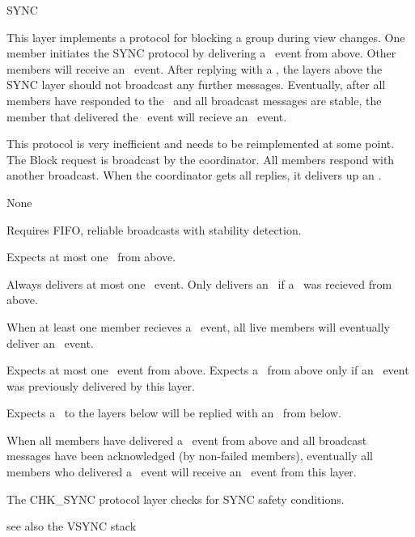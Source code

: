 \begin{Layer}{SYNC}

This layer implements a protocol for blocking a group during view changes.  One
member initiates the SYNC protocol by delivering a \DnBlock\ event from above.
Other members will receive an \UpBlock\ event.  After replying with a
\DnBlockOk, the layers above the SYNC layer should not broadcast any further
messages.  Eventually, after all members have responded to the \UpBlock\ and
all broadcast messages are stable, the member that delivered the \DnBlock\
event will recieve an \UpBlockOk\ event.

\begin{Protocol}
This protocol is very inefficient and needs to be reimplemented at some
point.  The Block request is broadcast by the coordinator.  All members
respond with another broadcast.  When the coordinator gets all replies, it
delivers up an \UpBlockOk.
\end{Protocol}

\begin{Parameters}
\item None
\end{Parameters}

\begin{Properties}
\item
Requires FIFO, reliable broadcasts with stability detection.
\item
Expects at most one \DnBlock\ from above.
\item
Always delivers at most one \UpBlockOk\ event.  Only delivers an \UpBlockOk\ if
a \DnBlock\ was recieved from above.
\item
When at least one member recieves a \DnBlock\ event, all live members will
eventually deliver an \UpBlock\ event.
\item
Expects at most one \DnBlockOk\ event from above.  Expects a \DnBlockOk\ from
above only if an \UpBlock\ event was previously delivered by this layer.
\item
Expects a \DnBlock\ to the layers below will be replied with an \UpBlock\ from
below.
\item
When all members have delivered a \DnBlockOk\ event from above and all
broadcast messages have been acknowledged (by non-failed members),
eventually all members who delivered a \DnBlock\ event will receive an
\UpBlockOk\ event from this layer.
\end{Properties}

\begin{Sources}
\end{Sources}

\begin{GenEvent}
\genevent{\UpBlockOk}
\genevent{\DnAck}
\genevent{\DnBlock}
\end{GenEvent}

\begin{Testing}
\item
The CHK\_SYNC protocol layer checks for SYNC safety conditions.
\item 
see also the VSYNC stack
\end{Testing}
\end{Layer}
